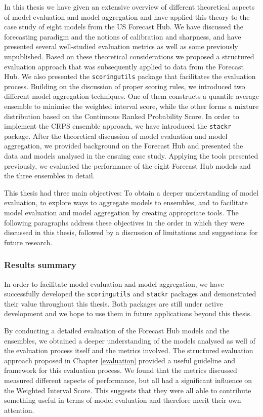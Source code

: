 \documentclass[
]{book}
\begin{document}
In this thesis we have given an extensive overview of different theoretical aspects of model evaluation and model aggregation and have applied this theory to the case study of eight models from the US Forecast Hub. We have discussed the forecasting paradigm and the notions of calibration and sharpness, and have presented several well-studied evaluation metrics as well as some previously unpublished. Based on these theoretical considerations we proposed a structured evaluation approach that was subsequently applied to data from the Forecast Hub. We also presented the \texttt{scoringutils} package that facilitates the evaluation process. Building on the discussion of proper scoring rules, we introduced two different model aggregation techniques. One of them constructs a quantile average ensemble to minimise the weighted interval score, while the other forms a mixture distribution based on the Continuous Ranked Probability Score. In order to implement the CRPS ensemble approach, we have introduced the \texttt{stackr} package. After the theoretical discussion of model evaluation and model aggregation, we provided background on the Forecast Hub and presented the data and models analysed in the ensuing case study. Applying the tools presented previously, we evaluated the performance of the eight Forecast Hub models and the three ensembles in detail.

This thesis had three main objectives: To obtain a deeper understanding of model evaluation,
to explore ways to aggregate models to ensembles, and to facilitate model evaluation and model
aggregation by creating appropriate tools. The following paragraphs address these objectives in the order in which they were discussed in this thesis, followed by a discussion of limitations and suggestions for future research.

\hypertarget{results-summary}{%
\subsubsection*{Results summary}\label{results-summary}}

In order to facilitate model evaluation and model aggregation, we have successfully developed the \texttt{scoringutils} and \texttt{stackr} packages and demonstrated their value throughout this thesis. Both packages are still under active development and we hope to use them in future applications beyond this thesis.

By conducting a detailed evaluation of the Forecast Hub models and the ensembles, we obtained a deeper understanding of the models analysed as well of the evaluation process itself and the metrics involved. The structured evaluation approach proposed in Chapter \ref{evaluation} provided a useful guideline and framework for this evaluation process. We found that the metrics discussed measured different aspects of performance, but all had a significant influence on the Weighted Interval Score. This suggests that they were all able to contribute something useful in terms of model evaluation and therefore merit their own attention.
\end{document}
